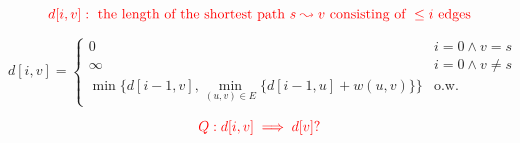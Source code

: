 \begin{frame}{}
  \begin{center}
  \end{center}

  \pause
  \[
    \textcolor{red}{d[i, v]: \text{ the length of the shortest path } s \leadsto v \text{ consisting of } \le i \text{ edges}}
  \]

  \pause
  \[
    d[i,v] = \begin{cases}
      0 & i = 0 \land v = s \\
      \infty & i = 0 \land v \neq s \\
      \min\Big\{ d[i-1, v], \min\limits_{(u,v) \in E} \big\{ d[i-1, u] + w(u,v) \big\} \Big\} & \text{o.w.}
    \end{cases}
  \]
\end{frame}

\begin{frame}{}
  

  \pause
  \[
    \textcolor{red}{Q: d[i, v] \implies d[v]?}
  \]
\end{frame}

